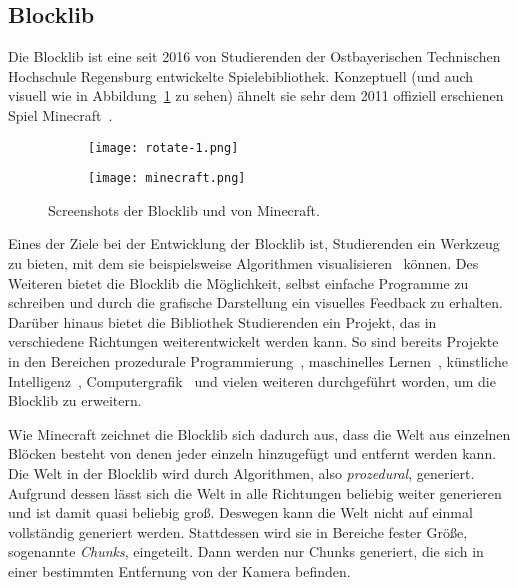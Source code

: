 \subsection{Blocklib}
Die Blocklib ist eine seit 2016 von Studierenden der Ostbayerischen Technischen Hochschule Regensburg entwickelte Spielebibliothek. Konzeptuell (und auch visuell wie in Abbildung~\ref{fig:blocklibminecraft} zu sehen) ähnelt sie sehr dem 2011 offiziell erschienen Spiel Minecraft~\cite{Mojang}.
\begin{figure}[!htbp]
	\begin{subfigure}[b]{.49\textwidth}
		\texttt{[image: rotate-1.png]}
	\end{subfigure}
	\begin{subfigure}[b]{.49\textwidth}
		\texttt{[image: minecraft.png]}
	\end{subfigure}
	\caption{Screenshots der Blocklib und von Minecraft.}\label{fig:blocklibminecraft}
\end{figure}
Eines der Ziele bei der Entwicklung der Blocklib ist, Studierenden ein Werkzeug zu bieten, mit dem sie beispielsweise Algorithmen visualisieren~\cite{Helgert2018} können. Des Weiteren bietet die Blocklib die Möglichkeit, selbst einfache Programme zu schreiben und durch die grafische Darstellung ein visuelles Feedback zu erhalten. Darüber hinaus bietet die Bibliothek Studierenden ein Projekt, das in verschiedene Richtungen weiterentwickelt werden kann. So sind bereits Projekte in den Bereichen prozedurale Programmierung~\cite{Beer2017,Ebbinger2018a,Kalle2018,Sellner2020,Kohler2021}, maschinelles Lernen~\cite{Mayer2021}, künstliche Intelligenz~\cite{Amthor2017,Weidner2018,Bunke2021,Mayer2021}, Computergrafik~\cite{Zink2016,Ebbinger2018,Werner2018} und vielen weiteren durchgeführt worden, um die Blocklib zu erweitern.

Wie Minecraft zeichnet die Blocklib sich dadurch aus, dass die Welt aus einzelnen Blöcken besteht von denen jeder einzeln hinzugefügt und entfernt werden kann. Die Welt in der Blocklib wird durch Algorithmen, also \emph{prozedural}, generiert. Aufgrund dessen lässt sich die Welt in alle Richtungen beliebig weiter generieren und ist damit quasi beliebig groß. Deswegen kann die Welt nicht auf einmal vollständig generiert werden. Stattdessen wird sie in Bereiche fester Größe, sogenannte \emph{Chunks}, eingeteilt. Dann werden nur Chunks generiert, die sich in einer bestimmten Entfernung von der Kamera befinden.


